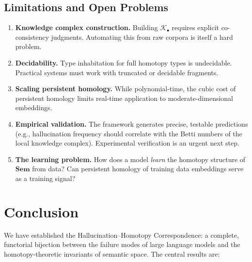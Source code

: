 \documentclass[11pt,a4paper]{article}
\theoremstyle{plain}
\theoremstyle{definition}
\newcommand{\Sem}{\mathbf{Sem}}
\begin{document}
\subsection{Limitations and Open Problems}

\begin{enumerate}[leftmargin=*]
  \item \textbf{Knowledge complex construction.} Building $\mathcal{K}_\bullet$ requires explicit co-consistency judgments. Automating this from raw corpora is itself a hard problem.
  
  \item \textbf{Decidability.} Type inhabitation for full homotopy types is undecidable. Practical systems must work with truncated or decidable fragments.
  
  \item \textbf{Scaling persistent homology.} While polynomial-time, the cubic cost of persistent homology limits real-time application to moderate-dimensional embeddings.
  
  \item \textbf{Empirical validation.} The framework generates precise, testable predictions (e.g., hallucination frequency should correlate with the Betti numbers of the local knowledge complex). Experimental verification is an urgent next step.
  
  \item \textbf{The learning problem.} How does a model \emph{learn} the homotopy structure of $\Sem$ from data? Can persistent homology of training data embeddings serve as a training signal?
\end{enumerate}

\section{Conclusion}\label{sec:conclusion}

We have established the Hallucination--Homotopy Correspondence: a complete, functorial bijection between the failure modes of large language models and the homotopy-theoretic invariants of semantic space. The central results are:
\end{document}
